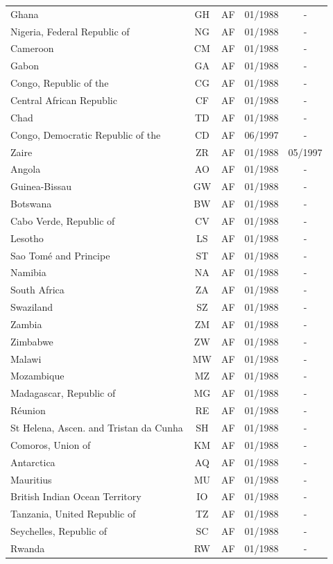 \begin{small}
\begin{longtable}{p{7.5cm}cccc}
Ghana	&	GH	&	AF	&	01/1988	&	-	\\
Nigeria, Federal Republic of	&	NG	&	AF	&	01/1988	&	-	\\
Cameroon	&	CM	&	AF	&	01/1988	&	-	\\
Gabon	&	GA	&	AF	&	01/1988	&	-	\\
Congo, Republic of the	&	CG	&	AF	&	01/1988	&	-	\\
Central African Republic	&	CF	&	AF	&	01/1988	&	-	\\
Chad	&	TD	&	AF	&	01/1988	&	-	\\
Congo, Democratic Republic of the	&	CD	&	AF	&	06/1997	&	-	\\
Zaire	&	ZR	&	AF	&	01/1988	&	05/1997	\\
Angola	&	AO	&	AF	&	01/1988	&	-	\\
Guinea-Bissau	&	GW	&	AF	&	01/1988	&	-	\\
Botswana	&	BW	&	AF	&	01/1988	&	-	\\
Cabo Verde, Republic of	&	CV	&	AF	&	01/1988	&	-	\\
Lesotho	&	LS	&	AF	&	01/1988	&	-	\\
Sao Tomé and Principe	&	ST	&	AF	&	01/1988	&	-	\\
Namibia	&	NA	&	AF	&	01/1988	&	-	\\
South Africa	&	ZA	&	AF	&	01/1988	&	-	\\
Swaziland	&	SZ	&	AF	&	01/1988	&	-	\\
Zambia	&	ZM	&	AF	&	01/1988	&	-	\\
Zimbabwe	&	ZW	&	AF	&	01/1988	&	-	\\
Malawi	&	MW	&	AF	&	01/1988	&	-	\\
Mozambique	&	MZ	&	AF	&	01/1988	&	-	\\
Madagascar, Republic of	&	MG	&	AF	&	01/1988	&	-	\\
Réunion	&	RE	&	AF	&	01/1988	&	-	\\
St Helena, Ascen. and Tristan da Cunha	&	SH	&	AF	&	01/1988	&	-	\\
Comoros, Union of	&	KM	&	AF	&	01/1988	&	-	\\
Antarctica	&	AQ	&	AF	&	01/1988	&	-	\\
Mauritius	&	MU	&	AF	&	01/1988	&	-	\\
British Indian Ocean Territory	&	IO	&	AF	&	01/1988	&	-	\\
Tanzania, United Republic of	&	TZ	&	AF	&	01/1988	&	-	\\
Seychelles, Republic of	&	SC	&	AF	&	01/1988	&	-	\\
Rwanda	&	RW	&	AF	&	01/1988	&	-	\\

\end{longtable}
\end{small}
